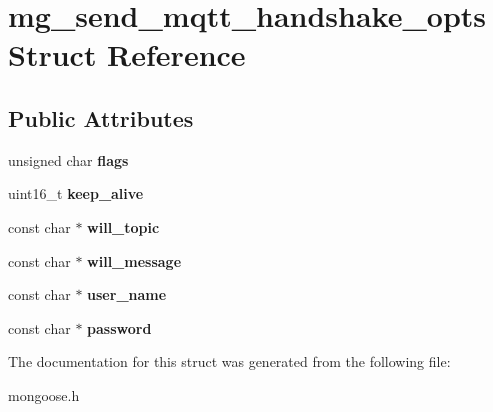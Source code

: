 \hypertarget{structmg__send__mqtt__handshake__opts}{}\section{mg\+\_\+send\+\_\+mqtt\+\_\+handshake\+\_\+opts Struct Reference}
\label{structmg__send__mqtt__handshake__opts}
\subsection*{Public Attributes}
\begin{DoxyCompactItemize}
\item 
\mbox{\label{structmg__send__mqtt__handshake__opts_a89a41409815899bd7ed46a510a162bc8}} 
unsigned char {\bfseries flags}
\item 
\mbox{\label{structmg__send__mqtt__handshake__opts_a39a20b37f0de09f81c6de35690f7d98f}} 
uint16\+\_\+t {\bfseries keep\+\_\+alive}
\item 
\mbox{\label{structmg__send__mqtt__handshake__opts_a7cdd8f59da7f39ccd8face3e7267d634}} 
const char $\ast$ {\bfseries will\+\_\+topic}
\item 
\mbox{\label{structmg__send__mqtt__handshake__opts_a747846d48256c35b24544a1e19321f09}} 
const char $\ast$ {\bfseries will\+\_\+message}
\item 
\mbox{\label{structmg__send__mqtt__handshake__opts_a3110a5a3589f32974b23f442b970ee85}} 
const char $\ast$ {\bfseries user\+\_\+name}
\item 
\mbox{\label{structmg__send__mqtt__handshake__opts_ac16baef17869ac723d502190b19780bf}} 
const char $\ast$ {\bfseries password}
\end{DoxyCompactItemize}


The documentation for this struct was generated from the following file\+:\begin{DoxyCompactItemize}
\item 
mongoose.\+h\end{DoxyCompactItemize}
